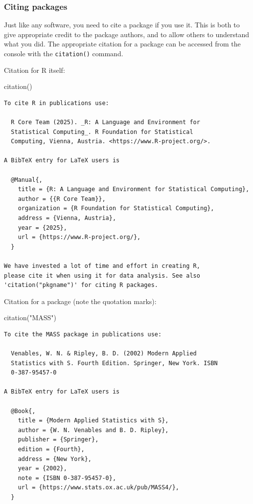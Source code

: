 \documentclass[
  13,
  letterpaper,
]{report}
\newenvironment{Shaded}{\begin{snugshade}}{\end{snugshade}}
\newcommand{\FunctionTok}[1]{\textcolor[rgb]{0.28,0.35,0.67}{#1}}
\newcommand{\NormalTok}[1]{\textcolor[rgb]{0.00,0.23,0.31}{#1}}
\newcommand{\StringTok}[1]{\textcolor[rgb]{0.13,0.47,0.30}{#1}}
\begin{document}
\subsubsection{Citing packages}\label{sec-r-pack-work-cite}

Just like any software, you need to cite a package if you use it. This
is both to give appropriate credit to the package authors, and to allow
others to understand what you did. The appropriate citation for a
package can be accessed from the console with the \texttt{citation()}
command.

Citation for R itself:

\begin{Shaded}
\begin{Highlighting}[]
\FunctionTok{citation}\NormalTok{()}
\end{Highlighting}
\end{Shaded}

\begin{verbatim}
To cite R in publications use:

  R Core Team (2025). _R: A Language and Environment for
  Statistical Computing_. R Foundation for Statistical
  Computing, Vienna, Austria. <https://www.R-project.org/>.

A BibTeX entry for LaTeX users is

  @Manual{,
    title = {R: A Language and Environment for Statistical Computing},
    author = {{R Core Team}},
    organization = {R Foundation for Statistical Computing},
    address = {Vienna, Austria},
    year = {2025},
    url = {https://www.R-project.org/},
  }

We have invested a lot of time and effort in creating R,
please cite it when using it for data analysis. See also
'citation("pkgname")' for citing R packages.
\end{verbatim}

Citation for a package (note the quotation marks):

\begin{Shaded}
\begin{Highlighting}[]
\FunctionTok{citation}\NormalTok{(}\StringTok{"MASS"}\NormalTok{)}
\end{Highlighting}
\end{Shaded}

\begin{verbatim}
To cite the MASS package in publications use:

  Venables, W. N. & Ripley, B. D. (2002) Modern Applied
  Statistics with S. Fourth Edition. Springer, New York. ISBN
  0-387-95457-0

A BibTeX entry for LaTeX users is

  @Book{,
    title = {Modern Applied Statistics with S},
    author = {W. N. Venables and B. D. Ripley},
    publisher = {Springer},
    edition = {Fourth},
    address = {New York},
    year = {2002},
    note = {ISBN 0-387-95457-0},
    url = {https://www.stats.ox.ac.uk/pub/MASS4/},
  }
\end{verbatim}
\end{document}
